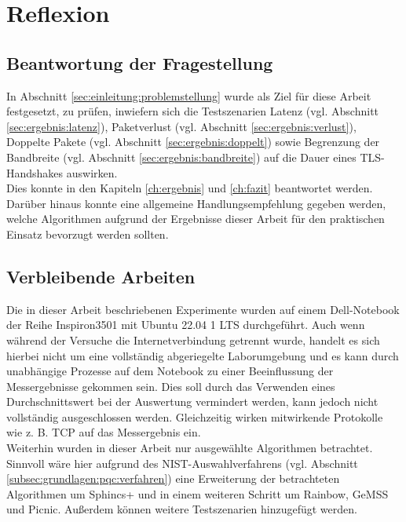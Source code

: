 \chapter{Reflexion}
\label{ch:ref}

	\section{Beantwortung der Fragestellung}
	\label{sec:ref:frage}
	
	In Abschnitt \ref{sec:einleitung:problemstellung} wurde als Ziel für diese Arbeit festgesetzt, zu prüfen, inwiefern sich die Testszenarien Latenz (vgl. Abschnitt \ref{sec:ergebnis:latenz}), Paketverlust (vgl. Abschnitt \ref{sec:ergebnis:verlust}), Doppelte Pakete (vgl. Abschnitt \ref{sec:ergebnis:doppelt}) sowie Begrenzung der Bandbreite (vgl. Abschnitt \ref{sec:ergebnis:bandbreite}) auf die Dauer eines TLS-Handshakes auswirken.\\
	
	Dies konnte in den Kapiteln \ref{ch:ergebnis} und \ref{ch:fazit} beantwortet werden.\\
	
	Darüber hinaus konnte eine allgemeine Handlungsempfehlung gegeben werden, welche Algorithmen aufgrund der Ergebnisse dieser Arbeit für den praktischen Einsatz bevorzugt werden sollten.

	\section{Verbleibende Arbeiten}
	\label{sec:ref:schwächen}
	
	Die in dieser Arbeit beschriebenen Experimente wurden auf einem Dell-Notebook der Reihe Inspiron3501 mit Ubuntu 22.04 1 LTS durchgeführt. Auch wenn während der Versuche die Internetverbindung getrennt wurde, handelt es sich hierbei nicht um eine vollständig abgeriegelte Laborumgebung und es kann durch unabhängige Prozesse auf dem Notebook zu einer Beeinflussung der Messergebnisse gekommen sein. Dies soll durch das Verwenden eines Durchschnittswert bei der Auswertung vermindert werden, kann jedoch nicht vollständig ausgeschlossen werden. Gleichzeitig wirken mitwirkende Protokolle wie z. B. TCP auf das Messergebnis ein.\\
	
	Weiterhin wurden in dieser Arbeit nur ausgewählte Algorithmen betrachtet. Sinnvoll wäre hier aufgrund des NIST-Auswahlverfahrens (vgl. Abschnitt \ref{subsec:grundlagen:pqc:verfahren}) eine Erweiterung der betrachteten Algorithmen um Sphincs+ und in einem weiteren Schritt um Rainbow, GeMSS und Picnic. Außerdem können weitere Testszenarien hinzugefügt werden.\\
	
